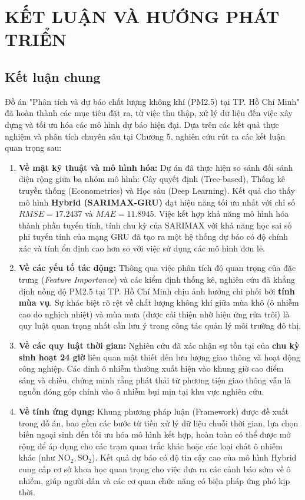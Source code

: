 \chapter{KẾT LUẬN VÀ HƯỚNG PHÁT TRIỂN}

\section{Kết luận chung}

Đồ án "Phân tích và dự báo chất lượng không khí (PM2.5) tại TP. Hồ Chí Minh" đã hoàn thành các mục tiêu đặt ra, từ việc thu thập, xử lý dữ liệu đến việc xây dựng và tối ưu hóa các mô hình dự báo hiện đại. Dựa trên các kết quả thực nghiệm và phân tích chuyên sâu tại Chương 5, nghiên cứu rút ra các kết luận quan trọng sau:

\begin{enumerate}
    \item \textbf{Về mặt kỹ thuật và mô hình hóa:} Dự án đã thực hiện so sánh đối sánh diện rộng giữa ba nhóm mô hình: Cây quyết định (Tree-based), Thống kê truyền thống (Econometrics) và Học sâu (Deep Learning). Kết quả cho thấy mô hình \textbf{Hybrid (SARIMAX-GRU)} đạt hiệu năng tối ưu nhất với chỉ số $RMSE = 17.2437$ và $MAE = 11.8945$. Việc kết hợp khả năng mô hình hóa thành phần tuyến tính, tính chu kỳ của SARIMAX với khả năng học sai số phi tuyến tính của mạng GRU đã tạo ra một hệ thống dự báo có độ chính xác và tính ổn định cao hơn so với việc sử dụng các mô hình đơn lẻ.

    \item \textbf{Về các yếu tố tác động:} Thông qua việc phân tích độ quan trọng của đặc trưng (\textit{Feature Importance}) và các kiểm định thống kê, nghiên cứu đã khẳng định nồng độ PM2.5 tại TP. Hồ Chí Minh chịu ảnh hưởng chi phối bởi \textbf{tính mùa vụ}. Sự khác biệt rõ rệt về chất lượng không khí giữa mùa khô (ô nhiễm cao do nghịch nhiệt) và mùa mưa (được cải thiện nhờ hiệu ứng rửa trôi) là quy luật quan trọng nhất cần lưu ý trong công tác quản lý môi trường đô thị.

    \item \textbf{Về các quy luật thời gian:} Nghiên cứu đã xác nhận sự tồn tại của \textbf{chu kỳ sinh hoạt 24 giờ} liên quan mật thiết đến lưu lượng giao thông và hoạt động công nghiệp. Các đỉnh ô nhiễm thường xuất hiện vào khung giờ cao điểm sáng và chiều, chứng minh rằng phát thải từ phương tiện giao thông vẫn là nguồn đóng góp chính vào ô nhiễm bụi mịn tại khu vực nghiên cứu.

    \item \textbf{Về tính ứng dụng:} Khung phương pháp luận (Framework) được đề xuất trong đồ án, bao gồm các bước từ tiền xử lý dữ liệu chuỗi thời gian, lựa chọn biến ngoại sinh đến tối ưu hóa mô hình kết hợp, hoàn toàn có thể được mở rộng để áp dụng cho các trạm quan trắc khác hoặc các loại chất ô nhiễm khác (như $\text{NO}_2, \text{SO}_2$). Kết quả dự báo có độ tin cậy cao của mô hình Hybrid cung cấp cơ sở khoa học quan trọng cho việc đưa ra các cảnh báo sớm về ô nhiễm, giúp người dân và các cơ quan chức năng có biện pháp ứng phó kịp thời.
\end{enumerate}

